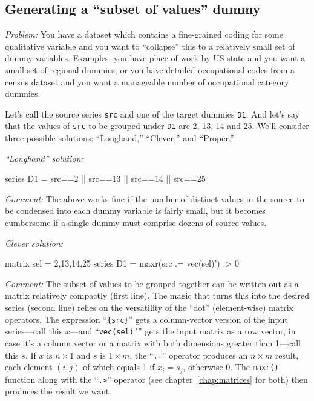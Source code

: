 \subsection{Generating a ``subset of values'' dummy}

\emph{Problem:} You have a dataset which contains a fine-grained
coding for some qualitative variable and you want to ``collapse'' this
to a relatively small set of dummy variables. Examples: you have place
of work by US state and you want a small set of regional dummies; or
you have detailed occupational codes from a census dataset and you
want a manageable number of occupational category dummies.

Let's call the source series \texttt{src} and one of the target dummies
\texttt{D1}. And let's say that the values of \texttt{src} to be grouped
under \texttt{D1} are 2, 13, 14 and 25. We'll consider three possible
solutions: ``Longhand,'' ``Clever,'' and ``Proper.''

\emph{``Longhand'' solution:}
\begin{code}
series D1 = src==2 || src==13 || src==14 || src==25
\end{code}

\emph{Comment:} The above works fine if the number of distinct values
in the source to be condensed into each dummy variable is fairly
small, but it becomes cumbersome if a single dummy must comprise
dozens of source values.

\emph{Clever solution:}
\begin{code}
matrix sel = {2,13,14,25}
series D1 = maxr({src} .= vec(sel)') .> 0
\end{code}

\emph{Comment:} The subset of values to be grouped together can be
written out as a matrix relatively compactly (first line). The magic
that turns this into the desired series (second line) relies on the
versatility of the ``dot'' (element-wise) matrix operators. The
expression ``\texttt{\{src\}}'' gets a column-vector version of the
input series---call this $x$---and ``\texttt{vec(sel)'}'' gets the
input matrix as a row vector, in case it's a column vector or a matrix
with both dimensions greater than 1---call this $s$. If $x$ is
$n\times1$ and $s$ is $1\times m$, the ``\texttt{.=}'' operator
produces an $n\times m$ result, each element $(i,j)$ of which equals 1
if $x_i = s_j$, otherwise 0. The \texttt{maxr()} function along with
the ``\verb|.>|'' operator (see chapter~\ref{chap:matrices} for both)
then produces the result we want.

